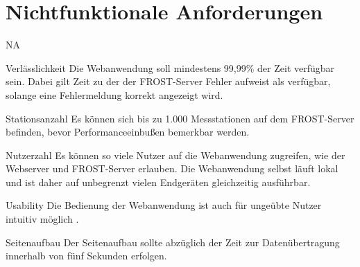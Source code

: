 \section{Nichtfunktionale Anforderungen}

\setcounter{counter}{10}
\begin{Kriterien}{NA}
    \item[Verlässlichkeit]
        Die \gls{Webanwendung} soll mindestens 99,99\% der Zeit verfügbar sein.
        Dabei gilt Zeit zu der der \gls{FROST-Server} Fehler aufweist als verfügbar, solange eine Fehlermeldung korrekt angezeigt wird.
    \item[Stationsanzahl]
        Es können sich bis zu 1.000 Messstationen auf dem \gls{FROST-Server} befinden, bevor Performanceeinbußen bemerkbar werden.
    \item[Nutzerzahl]
        Es können so viele Nutzer auf die \gls{Webanwendung} zugreifen, wie der \gls{Webserver} und \gls{FROST-Server} erlauben.
        Die \gls{Webanwendung} selbst läuft lokal und ist daher auf unbegrenzt vielen Endgeräten gleichzeitig ausführbar.
    \item[Usability]
        Die Bedienung der \gls{Webanwendung} ist auch für ungeübte Nutzer intuitiv möglich .
    \item[Seitenaufbau]
        Der Seitenaufbau sollte abzüglich der Zeit zur Datenübertragung innerhalb von fünf Sekunden erfolgen.
\end{Kriterien}